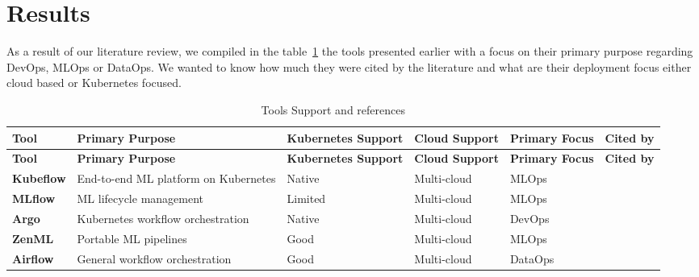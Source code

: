 \section{Results}\label{sec:stresults}

As a result of our literature review, we compiled in the table~\ref{tab:tools} the tools presented earlier with a focus on their primary purpose regarding DevOps, MLOps or DataOps.
We wanted to know how much they were cited by the literature
and what are their deployment focus either cloud based or Kubernetes focused.

\footnotesize
\begin{longtable}{|p{2cm}|p{3.5cm}|p{2cm}|p{2cm}|p{1.5cm}|p{1.5cm}|}
    \caption{Tools Support and references} \label{tab:tools}
    \hline
    \textbf{Tool} & \textbf{Primary Purpose} & \textbf{Kubernetes Support} & \textbf{Cloud Support} & \textbf{Primary Focus} & \textbf{Cited by} \\
    \hline
    \endfirsthead

    \hline
    \textbf{Tool} & \textbf{Primary Purpose} & \textbf{Kubernetes Support} & \textbf{Cloud Support} & \textbf{Primary Focus} & \textbf{Cited by} \\
    \hline
    \endhead

    \hline
    \endfoot

    \hline
    \endlastfoot

    \textbf{Kubeflow} & End-to-end ML platform on Kubernetes & Native & Multi-cloud & MLOps & \cite{FANNOUCH2025100321,Kreuzberger2022MachineLO,9792270,inproceedings, mlops-definition-tools-and-challenge} \\
    \hline

    \textbf{MLflow} & ML lifecycle management & Limited & Multi-cloud & MLOps & \cite{RODRIGUES2025104169, mlflow,Haakman2021,Kreuzberger2022MachineLO,BURGUENOROMERO2025107499,inproceedings} \\
    \hline

    \textbf{Argo} & Kubernetes workflow orchestration & Native & Multi-cloud & DevOps & \cite{inproceedings} \\
    \hline

    \textbf{ZenML} & Portable ML pipelines & Good & Multi-cloud & MLOps & \cite{} \\
    \hline

    \textbf{Airflow} & General workflow orchestration & Good & Multi-cloud & DataOps & \cite{mlflow,Kreuzberger2022MachineLO,BURGUENOROMERO2025107499} \\
    \hline


\end{longtable}
